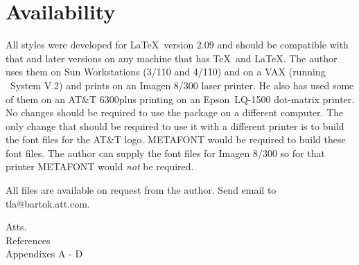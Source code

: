 \part{Availability}
All styles were developed for \LaTeX\ version 2.09 and should
be compatible with that and later versions on any machine that has
\TeX\ and \LaTeX .  The author uses them on Sun Workstations
(3/110 and 4/110) and
on a VAX (running \UNIX\ System V.2) and prints on an
Imagen 8/300 laser printer.  He also has
used some of them on an AT\&T 6300plus printing on an Epson\tm\
LQ-1500 dot-matrix 
printer.  No changes should be required to use the package on a
different computer.  The only change that should be required to 
use it with a different printer is to build the font files for the
AT\&T logo.  METAFONT would be required to build these font files.  
The author can supply the font files for Imagen 8/300 so for that
printer METAFONT would {\it not} be required. 

All files are available on request from the author.  Send email to
tla@bartok.att.com.
\makesignature

\noindent Atts.\\
References\\
Appendixes A - D

